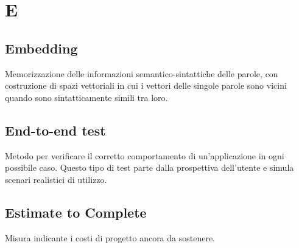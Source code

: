 \chapter{E}
\section{Embedding}
Memorizzazione delle informazioni semantico-sintattiche delle parole, con costruzione di spazi vettoriali in cui i vettori delle singole parole sono vicini quando sono sintatticamente simili tra loro.

\section{End-to-end test}
Metodo per verificare il corretto comportamento di un'applicazione in ogni possibile caso. Questo tipo di test parte dalla prospettiva dell'utente e simula scenari realistici di utilizzo.

\section{Estimate to Complete}
Misura indicante i costi di progetto ancora da sostenere.